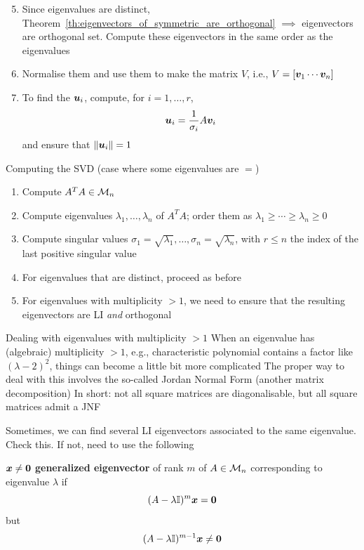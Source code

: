 \documentclass[aspectratio=169]{beamer}\usepackage[]{graphicx}\usepackage[]{xcolor}
\begin{document}
\begin{frame}
\begin{enumerate}
\setcounter{enumi}{4}
\item Since eigenvalues are distinct, Theorem~\ref{th:eigenvectors_of_symmetric_are_orthogonal} $\implies$ eigenvectors are orthogonal set. Compute these eigenvectors in the same order as the eigenvalues
\item Normalise them and use them to make the matrix $V$, i.e., $V=[\bm{v}_1\cdots\bm{v}_n]$
\item To find the $\bm{u}_i$, compute, for $i=1,\ldots,r$,
\[
\bm{u}_i = \frac{1}{\sigma_i}A\bm{v}_i
\]
and ensure that $\|\bm{u}_i\|=1$
\end{enumerate}
\end{frame}


\begin{frame}{Computing the SVD (case where some eigenvalues are $=$)}
\begin{enumerate}
\item Compute $A^TA\in\mathcal{M}_n$
\item Compute eigenvalues $\lambda_1,\ldots,\lambda_n$ of $A^TA$; order them as $\lambda_1\geq\cdots\geq\lambda_n\geq 0$
\item Compute singular values $\sigma_1=\sqrt{\lambda_1},\ldots,\sigma_n=\sqrt{\lambda_n}$, with $r\leq n$ the index of the last positive singular value
\item For eigenvalues that are distinct, proceed as before
\item For eigenvalues with multiplicity $>1$, we need to ensure that the resulting eigenvectors are LI \emph{and} orthogonal
\end{enumerate}
\end{frame}

\begin{frame}{Dealing with eigenvalues with multiplicity $>1$}
When an eigenvalue has (algebraic) multiplicity $>1$, e.g., characteristic polynomial contains a factor like $(\lambda-2)^2$, things can become a little bit more complicated
\vfill
The proper way to deal with this involves the so-called Jordan Normal Form (another matrix decomposition)
\vfill
In short: not all square matrices are diagonalisable, but all square matrices admit a JNF
\end{frame}


\begin{frame}
Sometimes, we can find several LI eigenvectors associated to the same eigenvalue. Check this. If not, need to use the following
\vfill
\begin{definition}
$\bx\neq\b0$ \textbf{generalized eigenvector} of rank $m$ of $A\in\mathcal{M}_n$ corresponding to eigenvalue $\lambda$ if
\[
(A-\lambda\II)^{m}\bx = \b0
\]
but
\[
(A-\lambda\II)^{m-1}\bx\neq \b0
\]
\end{definition}
\end{frame}
\end{document}
